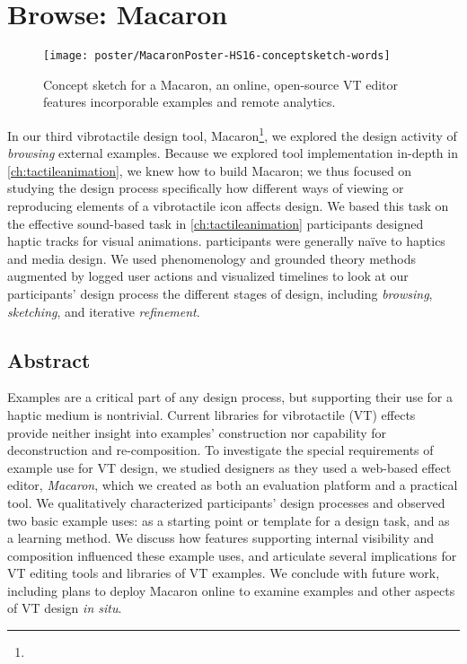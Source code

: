


\chapter{Browse: Macaron}
\label{ch:macaron}

\begin{figure}[htbp]
\begin{center}
\texttt{[image: poster/MacaronPoster-HS16-conceptsketch-words]}
\caption{Concept sketch for a Macaron, an online, open-source VT editor features incorporable examples and remote analytics.}
\label{hapticexamples:designgallerysketch}
\end{center}
\end{figure}

\noindent
{} 
In our third vibrotactile design tool, Macaron\footnote{}, we explored the design activity of \emph{browsing} external examples.
Because we explored \haxd tool implementation in-depth in \autoref{ch:tactileanimation}, we knew how to build Macaron; we thus focused on studying the design process specifically  how different ways of viewing or reproducing elements of a vibrotactile icon affects design.
We based this task on the effective sound-based task in \autoref{ch:tactileanimation}\osE{:} participants designed haptic tracks for visual animations.
 participants were generally na\"ive to haptics and media design.
We used phenomenology and grounded theory methods augmented by logged user actions and visualized timelines to look at our participants' design process
the different stages of design, including \emph{browsing}, \emph{sketching}, and iterative \emph{refinement}.


\section{Abstract}
Examples are a critical part of any design process,
but supporting their use for a haptic medium is nontrivial.
Current  libraries for vibrotactile (VT) effects provide neither insight into examples' construction nor  capability for 
deconstruction and re-composition.
To investigate the special requirements of example use for VT design, we studied designers as they used a web-based effect editor, \emph{Macaron}, which we created as both an evaluation platform and a practical tool. 
We qualitatively characterized participants' design processes and observed two basic example uses: as a starting point or template for a design task, and as a learning method.
We discuss how features supporting internal visibility and composition influenced these example uses, and articulate several implications for VT editing tools and libraries of VT examples.
We conclude with future work, including plans to deploy Macaron online to examine examples and other aspects of VT design \emph{in situ}.



